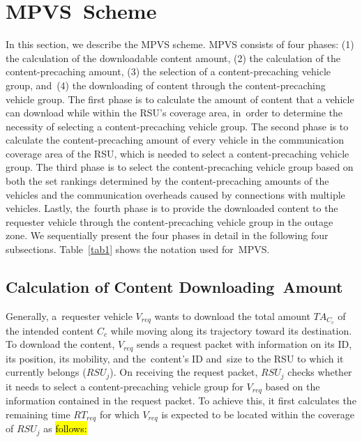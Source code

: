 \documentclass[sensors,aricle,accept,pdftex,moreauthors]{Definitions/mdpi}
\begin{document}
\section{MPVS~Scheme} \label{sec4}
In this section, we describe {the MPVS} scheme. MPVS consists of four phases: 
(1) the calculation of the downloadable content amount, (2) the calculation of the content-precaching amount, (3) the selection of a content-precaching vehicle group, and~(4) the downloading of content through the content-precaching vehicle group.
The first phase is to calculate the amount of content that a vehicle can download while within the RSU's coverage area, 
in~order to determine the necessity of selecting a content-precaching vehicle group.
The second phase is to calculate the content-precaching amount of every vehicle in the communication coverage area of the RSU, which is needed to select a content-precaching vehicle group.
The third phase is to select the content-precaching vehicle group based on both the set rankings determined by the content-precaching amounts of the vehicles and the communication overheads caused by connections with multiple vehicles.
Lastly, the~fourth phase is to provide the downloaded content to the requester vehicle through the content-precaching vehicle group in the outage zone.
We sequentially present the four phases in detail in the following four subsections.
Table~\ref{tab1} shows the notation used for~MPVS.


\subsection{Calculation of Content Downloading~Amount}
Generally, a~requester vehicle $V_{req}$ wants to download the total amount $TA_{C_{c}}$ of the intended content $C_{c}$ while moving along its trajectory toward its destination.
To download the content, $V_{req}$ sends a request packet with information on its ID, its position, its mobility, and the~content's ID and~size to the RSU to which it currently belongs ($RSU_{j}$).
On receiving the request packet, $RSU_{j}$ checks whether it needs to select a content-precaching vehicle group for $V_{req}$ based on the information contained in the request packet.
To achieve this, it first calculates the remaining time $RT_{req}$ for which $V_{req}$ is expected to be located within the coverage of $RSU_{j}$ as \hl{follows:} 
\end{document}
